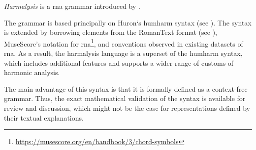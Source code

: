 

\emph{Harmalysis} is a \gls{rna} grammar introduced by
\textcite{napoleslopez2020harmalysis}.

The  grammar is based principally on
Huron‘s \gls{humharm} syntax (see
). The syntax is extended by
borrowing elements from the RomanText format (see
), MuseScore's notation for
\gls{rna}\footnote{\href{https://musescore.org/en/handbook/3/chord-symbols\#rna}{https://musescore.org/en/handbook/3/chord-symbols}},
and conventions observed in existing datasets of \gls{rna}.
As  a result,  the harmalysis language is a superset  of the
\gls{humharm} syntax,  which includes additional features
and supports a wider range of customs of harmonic analysis.

The main advantage of this syntax is that it is formally
defined as a context-free grammar. Thus, the exact
mathematical validation of the syntax is available for
review and discussion, which might not be the case for
representations defined by their textual explanations.
